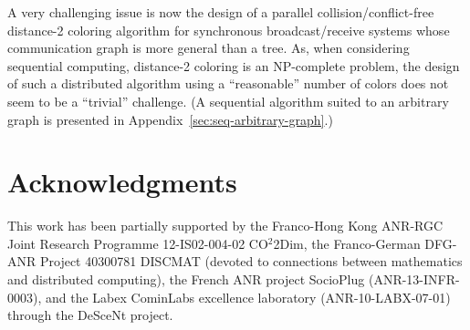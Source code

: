 \documentclass[11pt,english]{article}
\begin{document}
A very challenging issue is now the design of a parallel 
collision/conflict-free distance-2 coloring algorithm for synchronous
broadcast/receive systems whose communication graph is more general
than a tree. As, when considering sequential computing, 
distance-2 coloring is an NP-complete problem, the design of such a
distributed algorithm using a ``reasonable'' number of colors does not seem
to be a  ``trivial''  challenge. (A sequential algorithm suited to an 
arbitrary graph is presented in Appendix~\ref{sec:seq-arbitrary-graph}.) 



\section*{Acknowledgments}
This work has been partially supported by the Franco-Hong Kong ANR-RGC
Joint Research Programme 12-IS02-004-02 CO$^2$2Dim, the Franco-German
DFG-ANR Project 40300781 DISCMAT (devoted to connections between
mathematics and distributed computing), the French ANR project
SocioPlug (ANR-13-INFR-0003), and the Labex CominLabs excellence
laboratory (ANR-10-LABX-07-01) through the DeSceNt project.  
\end{document}
